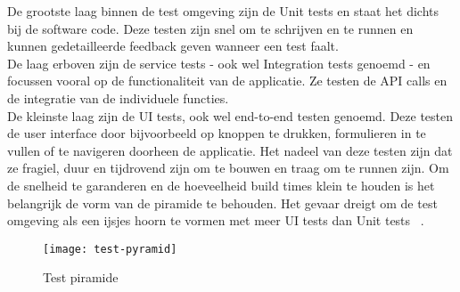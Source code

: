         De grootste laag binnen de test omgeving zijn de Unit tests en staat het dichts bij de software code. Deze testen zijn snel om te schrijven en te runnen en kunnen gedetailleerde feedback geven wanneer een test faalt.\\
        De laag erboven zijn de service tests - ook wel Integration tests genoemd - en focussen vooral op de functionaliteit van de applicatie. Ze testen de API calls en de integratie van de individuele functies.\\
        De kleinste laag zijn de UI tests, ook wel end-to-end testen genoemd. Deze testen de user interface door bijvoorbeeld op knoppen te drukken, formulieren in te vullen of te navigeren doorheen de applicatie. Het nadeel van deze testen zijn dat ze fragiel, duur en tijdrovend zijn om te bouwen en traag om te runnen zijn.
        Om de snelheid te garanderen en de hoeveelheid build times klein te houden is het belangrijk de vorm van de piramide te behouden. Het gevaar dreigt om de test omgeving als een ijsjes hoorn te vormen met meer UI tests dan Unit tests ~\autocite{Fowler2012}.
        \begin{figure}	
            \texttt{[image: test-pyramid]}
            \caption{Test piramide ~\autocite{Vocke2018}} \label{img-test-pyramid}
        \end{figure}